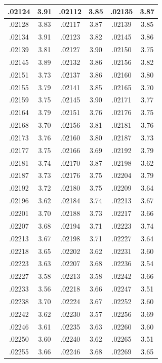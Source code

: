 \documentclass[10pt,twoside]{report}
\begin{document}
\begin{appendices}
\begin{longtable}{|c|c||c|c||c|c|}
.02124 & 3.91 & .02112 & 3.85 & .02135 & 3.87\\\hline
.02128 & 3.83 & .02117 & 3.87 & .02139 & 3.85\\\hline
.02134 & 3.91 & .02123 & 3.82 & .02145 & 3.86\\\hline
.02139 & 3.81 & .02127 & 3.90 & .02150 & 3.75\\\hline
.02145 & 3.89 & .02132 & 3.86 & .02156 & 3.82\\\hline
.02151 & 3.73 & .02137 & 3.86 & .02160 & 3.80\\\hline
.02155 & 3.79 & .02141 & 3.85 & .02165 & 3.70\\\hline
.02159 & 3.75 & .02145 & 3.90 & .02171 & 3.77\\\hline
.02164 & 3.79 & .02151 & 3.76 & .02176 & 3.75\\\hline
.02168 & 3.70 & .02156 & 3.81 & .02181 & 3.76\\\hline
.02173 & 3.76 & .02160 & 3.80 & .02187 & 3.73\\\hline
.02177 & 3.75 & .02166 & 3.69 & .02192 & 3.79\\\hline
.02181 & 3.74 & .02170 & 3.87 & .02198 & 3.62\\\hline
.02187 & 3.73 & .02176 & 3.75 & .02204 & 3.79\\\hline
.02192 & 3.72 & .02180 & 3.75 & .02209 & 3.64\\\hline
.02196 & 3.62 & .02184 & 3.74 & .02213 & 3.67\\\hline
.02201 & 3.70 & .02188 & 3.73 & .02217 & 3.66\\\hline
.02207 & 3.68 & .02194 & 3.71 & .02223 & 3.74\\\hline
.02213 & 3.67 & .02198 & 3.71 & .02227 & 3.64\\\hline
.02218 & 3.65 & .02202 & 3.62 & .02231 & 3.60\\\hline
.02223 & 3.63 & .02207 & 3.68 & .02236 & 3.54\\\hline
.02227 & 3.58 & .02213 & 3.58 & .02242 & 3.66\\\hline
.02233 & 3.56 & .02218 & 3.66 & .02247 & 3.51\\\hline
.02238 & 3.70 & .02224 & 3.67 & .02252 & 3.60\\\hline
.02242 & 3.62 & .02230 & 3.57 & .02256 & 3.69\\\hline
.02246 & 3.61 & .02235 & 3.63 & .02260 & 3.60\\\hline
.02250 & 3.60 & .02240 & 3.62 & .02265 & 3.51\\\hline
.02255 & 3.66 & .02246 & 3.68 & .02269 & 3.65\\\hline

\end{longtable}
\end{appendices}
\end{document}
